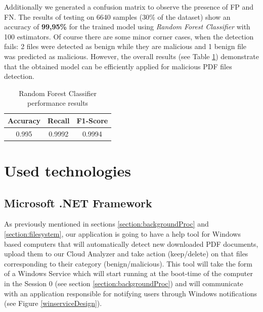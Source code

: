 Additionally we generated a confusion matrix to observe the presence of FP and FN. The results of testing on 6640 samples (30\% of the dataset) show an accuracy of \textbf{99,95\%} for the trained model using \textit{Random Forest Classifier} with 100 estimators. Of course there are some minor corner cases, when the detection fails: 2 files were detected as benign while they are malicious and 1 benign file was predicted as malicious. However, the overall results (see Table \ref{table:results}) demonstrate that the obtained model can be efficiently applied for malicious PDF files detection.

\begin{table}[H]
	\caption{Random Forest Classifier performance results}
	\label{table:results}
        \centering
            \begin{tabular}{c c c}
                \toprule
                
				\textbf{Accuracy} & \textbf{Recall} & \textbf{F1-Score} \\
				\hline 
                0.995 & 0.9992 & 0.9994 \\
                
                \bottomrule
			\end{tabular}
\end{table}


\newpage

\section{Used technologies}
\label{section:technologies}
\subsection{Microsoft .NET Framework}
As previously mentioned in sections \ref{section:backgroundProc} and \ref{section:filesystem}, our application is going to have a help tool for Windows based computers that will automatically detect new downloaded PDF documents, upload them to our Cloud Analyzer and take action (keep/delete) on that files corresponding to their category (benign/malicious). This tool will take the form of a Windows Service which will start running at the boot-time of the computer in the Session 0 (see section \ref{section:backgroundProc}) and will communicate with an application responsible for notifying users through Windows notifications (see Figure \ref{winserviceDesign}). 

